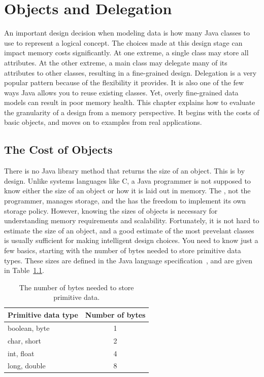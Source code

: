 \chapter{Objects and Delegation}
\label{chapter:delegation}

An important design decision when modeling data is how many Java classes to use to represent a logical concept. The choices made at this design stage can impact memory costs significantly. At one extreme, a single class may store all attributes. At the other extreme, a main class may delegate many of its attributes to other classes, resulting in a fine-grained design. Delegation is a very popular pattern because of the flexibility it provides. It is also one of the few ways Java allows you to reuse existing classes. Yet, overly fine-grained data models can result in poor memory health. This chapter explains how to evaluate the granularity of a design from a memory perspective. It begins with the costs of basic objects, and moves on to examples from real applications.
  
\section{The Cost of Objects}
\label{sec:CostOfObjects}

There is no Java library method that returns the size of an object. This is by
design. Unlike systems languages like C, a Java programmer is not supposed to
know either the size of an object or how it is laid out in memory. The \jre,
not the programmer, manages storage, and the \jre has the freedom to implement
its own storage policy. However, knowing the sizes of objects is necessary for understanding memory requirements and scalability. Fortunately, it is not hard to estimate the size of an object, and a good estimate of the most prevelant classes is usually sufficient for making intelligent design choices.  You need to know just a few basics, starting with the number of bytes needed to store primitive data types. These sizes are defined in the Java language specification~\cite{JavaSpec}, and are given in Table~\ref{tab:primitive-sizes}.
\begin{table}
  \centering
\begin{tabular}{lc} \toprule
	Primitive data type & Number of bytes \\ \midrule
	boolean, byte & 1 \\
	char, short & 2 \\
	int, float & 4 \\
	long, double & 8 \\
	\bottomrule
\end{tabular}
  \caption{The number of bytes needed to store primitive data.}
  \label{tab:primitive-sizes}
\end{table}

